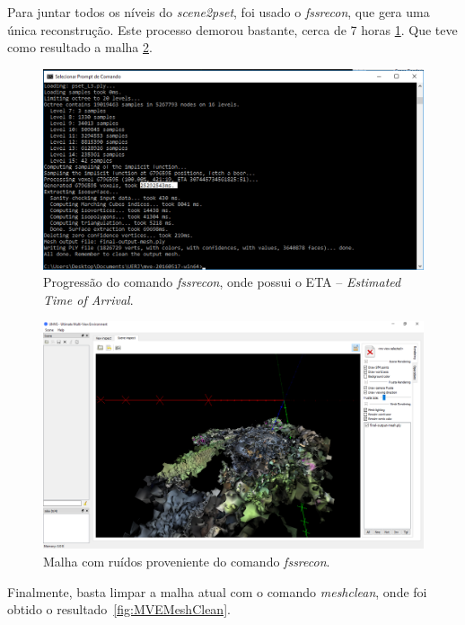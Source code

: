 Para juntar todos os níveis do \emph{scene2pset}, foi usado o \emph{fssrecon}, que gera uma única reconstrução. Este processo demorou bastante, cerca de 7 horas \ref{fig:MVEFSSR}. Que teve como resultado a malha \ref{fig:MVEFSSRMesh}.

\newpage

\begin{figure}[!h]
	\centering
	\includegraphics[width=0.8\linewidth]{figs/mvemeshtempo2.png}
	\caption{%
	Progressão do comando \emph{fssrecon}, onde possui o ETA -- \emph{Estimated Time of Arrival}.
	}\label{fig:MVEFSSR}
\end{figure} 

\begin{figure}[!h]
	\centering
	\includegraphics[width=1\linewidth]{figs/mvemeshout.png}
	\caption{%
	Malha com ruídos proveniente do comando \emph{fssrecon}.
	}\label{fig:MVEFSSRMesh}
\end{figure} 

Finalmente, basta limpar a malha atual com o comando \emph{meshclean}, onde foi obtido o resultado~\ref{fig:MVEMeshClean}.

\newpage

